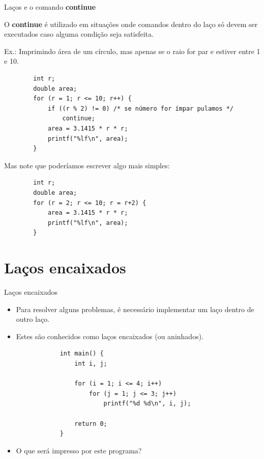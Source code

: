 \documentclass[handout]{beamer}
\begin{document}
\begin{frame}[fragile]{Laços e o comando {\bf continue}}

    O {\bf continue} é utilizado em situações onde comandos dentro do laço só devem ser executados caso alguma condição seja satisfeita.

    Ex.: Imprimindo área de um círculo, mas apenas se o raio for par e estiver entre 1 e 10.

    \begin{verbatim}
        int r;
        double area;
        for (r = 1; r <= 10; r++) {
            if ((r % 2) != 0) /* se número for ímpar pulamos */
                continue;
            area = 3.1415 * r * r;
            printf("%lf\n", area);
        }
    \end{verbatim}

    Mas note que poderíamos escrever algo mais simples:

    \begin{verbatim}
        int r;
        double area;
        for (r = 2; r <= 10; r = r+2) {
            area = 3.1415 * r * r;
            printf("%lf\n", area);
        }
    \end{verbatim}
\end{frame}

\section{Laços encaixados}%

\begin{frame}[fragile]{Laços encaixados}
    
    \begin{itemize}
        \item Para resolver alguns problemas, é necessário implementar um laço dentro de outro laço.
        \item Estes são conhecidos como laços encaixados (ou aninhados).
        
        \begin{verbatim}
            int main() {
                int i, j;
                
                for (i = 1; i <= 4; i++)
                    for (j = 1; j <= 3; j++)
                        printf("%d %d\n", i, j);

                return 0;
            }
        \end{verbatim}
    
        \item O que será impresso por este programa?
    \end{itemize}
\end{frame}
\end{document}
